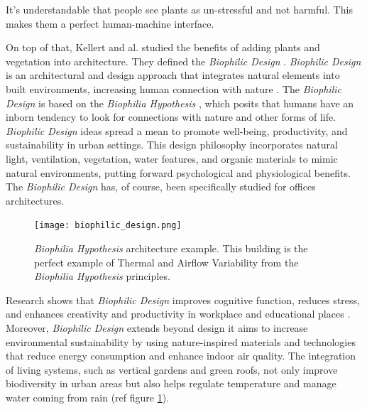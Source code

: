 It's understandable that people see plants as un-stressful and not harmful. This makes them a perfect human-machine interface.


On top of that, Kellert and al. studied the benefits of adding plants and vegetation into architecture. They defined the \textit{Biophilic Design} \cite{kellertBiophilicDesignTheory2008}.
\textit{Biophilic Design} is an architectural and design approach that integrates natural elements into built environments, increasing human connection with nature \cite{downtonBiophilicDesignApplications2017}. The \textit{Biophilic Design} is based on the \textit{Biophilia Hypothesis} \cite{kellertBiophiliaHypothesis}, which posits that humans have an inborn tendency to look for connections with nature and other forms of life. \textit{Biophilic Design} ideas spread a mean to promote well-being, productivity, and sustainability in urban settings. This design philosophy incorporates natural light, ventilation, vegetation, water features, and organic materials to mimic natural environments, putting forward psychological and physiological benefits. The \textit{Biophilic Design} has, of course, been specifically studied for offices architectures.

\begin{figure}[h!]
    \centering
    \texttt{[image: biophilic\_design.png]}
    \caption{\textit{Biophilia Hypothesis} architecture example. This building is the perfect example of Thermal and Airﬂow Variability from the \textit{Biophilia Hypothesis} principles.}
    \vspace{0.1cm}
    \label{fig:biophilic_design}
\end{figure}


Research shows that \textit{Biophilic Design} improves cognitive function, reduces stress, and enhances creativity and productivity in workplace and educational places \cite{kellert2015practice}. Moreover, \textit{Biophilic Design} extends beyond design it aims to increase environmental sustainability by using nature-inspired materials and technologies that reduce energy consumption and enhance indoor air quality. The integration of living systems, such as vertical gardens and green roofs, not only improve biodiversity in urban areas but also helps regulate temperature and manage water coming from rain \cite{ryanBiophilicDesign2018a} (ref figure \ref{fig:biophilic_design}).

